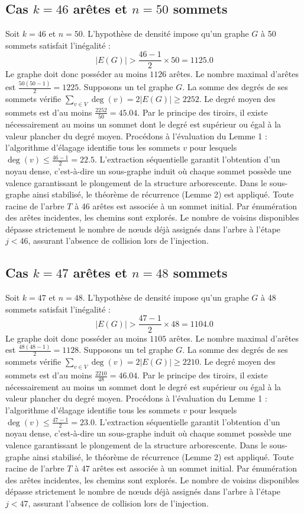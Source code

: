 \documentclass[12pt,a4paper]{article}
\begin{document}
\subsection{Cas $k = 46$ arêtes et $n = 50$ sommets}
Soit $k = 46$ et $n = 50$. L'hypothèse de densité impose qu'un graphe $G$ à 50 sommets satisfait l'inégalité :
$$ |E(G)| > \frac{46-1}{2} \times 50 = 1125.0 $$
Le graphe doit donc posséder au moins $1126$ arêtes. Le nombre maximal d'arêtes est $\frac{50(50-1)}{2} = 1225$.
Supposons un tel graphe $G$. La somme des degrés de ses sommets vérifie $\sum_{v \in V} \deg(v) = 2|E(G)| \geq 2252$.
Le degré moyen des sommets est d'au moins $\frac{2252}{50} = 45.04$.
Par le principe des tiroirs, il existe nécessairement au moins un sommet dont le degré est supérieur ou égal à la valeur plancher du degré moyen.
Procédons à l'évaluation du Lemme 1 : l'algorithme d'élagage identifie tous les sommets $v$ pour lesquels $\deg(v) \leq \frac{46-1}{2} = 22.5$.
L'extraction séquentielle garantit l'obtention d'un noyau dense, c'est-à-dire un sous-graphe induit où chaque sommet possède une valence garantissant le plongement de la structure arborescente.
Dans le sous-graphe ainsi stabilisé, le théorème de récurrence (Lemme 2) est appliqué. Toute racine de l'arbre $T$ à 46 arêtes est associée à un sommet initial. Par énumération des arêtes incidentes, les chemins sont explorés. Le nombre de voisins disponibles dépasse strictement le nombre de nœuds déjà assignés dans l'arbre à l'étape $j < 46$, assurant l'absence de collision lors de l'injection.

\subsection{Cas $k = 47$ arêtes et $n = 48$ sommets}
Soit $k = 47$ et $n = 48$. L'hypothèse de densité impose qu'un graphe $G$ à 48 sommets satisfait l'inégalité :
$$ |E(G)| > \frac{47-1}{2} \times 48 = 1104.0 $$
Le graphe doit donc posséder au moins $1105$ arêtes. Le nombre maximal d'arêtes est $\frac{48(48-1)}{2} = 1128$.
Supposons un tel graphe $G$. La somme des degrés de ses sommets vérifie $\sum_{v \in V} \deg(v) = 2|E(G)| \geq 2210$.
Le degré moyen des sommets est d'au moins $\frac{2210}{48} = 46.04$.
Par le principe des tiroirs, il existe nécessairement au moins un sommet dont le degré est supérieur ou égal à la valeur plancher du degré moyen.
Procédons à l'évaluation du Lemme 1 : l'algorithme d'élagage identifie tous les sommets $v$ pour lesquels $\deg(v) \leq \frac{47-1}{2} = 23.0$.
L'extraction séquentielle garantit l'obtention d'un noyau dense, c'est-à-dire un sous-graphe induit où chaque sommet possède une valence garantissant le plongement de la structure arborescente.
Dans le sous-graphe ainsi stabilisé, le théorème de récurrence (Lemme 2) est appliqué. Toute racine de l'arbre $T$ à 47 arêtes est associée à un sommet initial. Par énumération des arêtes incidentes, les chemins sont explorés. Le nombre de voisins disponibles dépasse strictement le nombre de nœuds déjà assignés dans l'arbre à l'étape $j < 47$, assurant l'absence de collision lors de l'injection.
\end{document}
